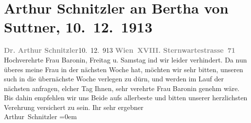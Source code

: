 

               \section[Arthur Schnitzler an Bertha von Suttner, 10. 12. 1913]{ Arthur Schnitzler an Bertha von Suttner,
                    10. 12. 1913}\nopagebreak{}\rehead{ }\begin{ledgroupsized}[t]{13cm}\normalsize\beginnumbering{} \toendnotes[C]{\smallbreak\pagebreak[2]} 
\toendnotes[C]{\smallbreak}\pstart
           \noindent{}{\pb}\textcolor{gray}{\textbf{Dr. Arthur Schnitzler}}\hfill 10. 12. 913\pend
           \pstart
           \textcolor{gray}{\textbf{Wien XVIII. Sternwartestrasse 71}}\pend
           \pstart
           Hochverehrte Frau Baronin, Freitag u. Samstag{ }ind wir leider verhindert. Da nun überes meine Frau in
                    der nächsten Woche \label{K_L02162_1v}\label{K_L02162_1h} hat, möchten wir sehr bitten, unseren such in die übernächste Woche verlegen zu dürn, und werden im Lauf der nächsten anfragen, elcher Tag Ihnen, sehr verehrte Frau Baronin {\pb}genehm wäre.\pend
           \pstart
           Bis dahin empfehlen wir uns Beide aufs allerbeste und bitten unserer herzlichsten Verehrung
                    versichert zu sein.\pend
           \pstart
           Ihr sehr ergebner{\\[\baselineskip]}\spacefill\mbox{Arthur Schnitzler}\pend
           \leftskip=0em{}\endnumbering{}\end{ledgroupsized}  \newcommand{\dateiname}{L02162}\newcommand{\titel}{Arthur Schnitzler an Bertha von Suttner, 10. 12. 1913}\newcommand{\editorInnen}{Martin Anton Müller und Gerd-Hermann Susen}
            \footnotesize
\begin{ledgroupsized}[t]{11.5cm}
\end{ledgroupsized}
         
      